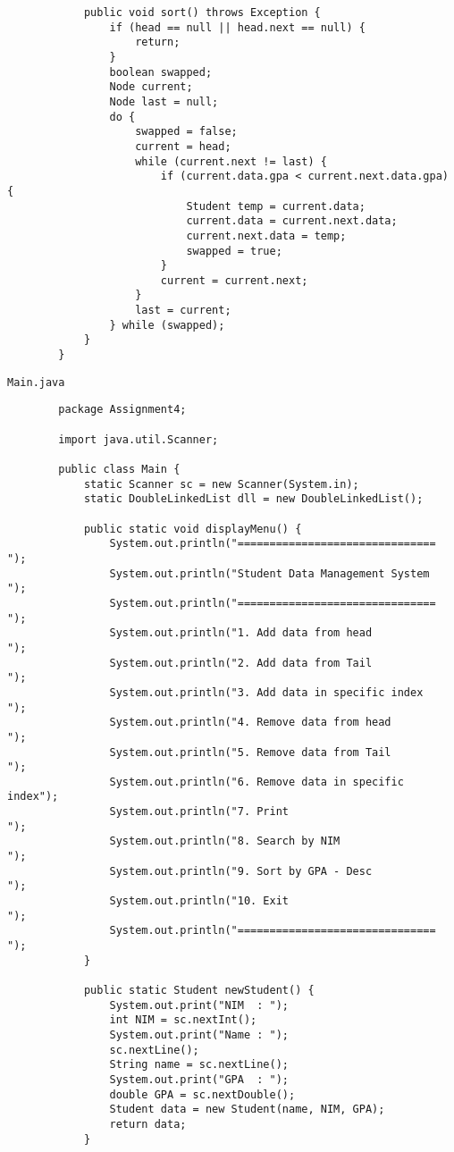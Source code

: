 \documentclass[12pt,titlepage]{article}
\begin{document}
\begin{enumerate}
\begin{verbatim}
            public void sort() throws Exception {
                if (head == null || head.next == null) {
                    return;
                }
                boolean swapped;
                Node current;
                Node last = null;
                do {
                    swapped = false;
                    current = head;
                    while (current.next != last) {
                        if (current.data.gpa < current.next.data.gpa) {
                            Student temp = current.data;
                            current.data = current.next.data;
                            current.next.data = temp;
                            swapped = true;
                        }
                        current = current.next;
                    }
                    last = current;
                } while (swapped);
            }
        }
    \end{verbatim}
    \texttt{Main.java}
    \begin{verbatim}
        package Assignment4;

        import java.util.Scanner;

        public class Main {
            static Scanner sc = new Scanner(System.in);
            static DoubleLinkedList dll = new DoubleLinkedList();

            public static void displayMenu() {
                System.out.println("=============================== ");
                System.out.println("Student Data Management System  ");
                System.out.println("=============================== ");
                System.out.println("1. Add data from head           ");
                System.out.println("2. Add data from Tail           ");
                System.out.println("3. Add data in specific index   ");
                System.out.println("4. Remove data from head        ");
                System.out.println("5. Remove data from Tail        ");
                System.out.println("6. Remove data in specific index");
                System.out.println("7. Print                        ");
                System.out.println("8. Search by NIM                ");
                System.out.println("9. Sort by GPA - Desc           ");
                System.out.println("10. Exit                        ");
                System.out.println("=============================== ");
            }

            public static Student newStudent() {
                System.out.print("NIM  : ");
                int NIM = sc.nextInt();
                System.out.print("Name : ");
                sc.nextLine();
                String name = sc.nextLine();
                System.out.print("GPA  : ");
                double GPA = sc.nextDouble();
                Student data = new Student(name, NIM, GPA);
                return data;
            }


\end{verbatim}
\end{enumerate}
\end{document}
